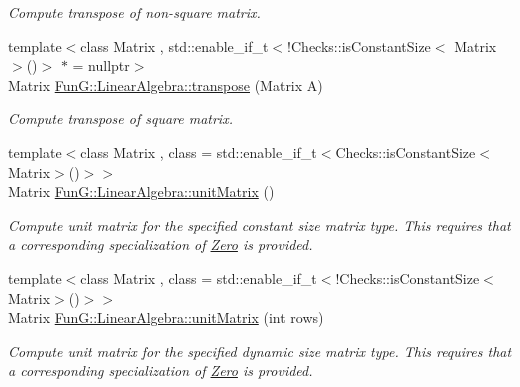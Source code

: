 \begin{DoxyCompactItemize}
\begin{DoxyCompactList}\small\item\em Compute transpose of non-\/square matrix. \end{DoxyCompactList}\item 
\hypertarget{group__LinearAlgebraGroup_gac3427d39b75727a255e5ea387c50ff10}{{\footnotesize template$<$class Matrix , std\-::enable\-\_\-if\-\_\-t$<$!\-Checks\-::is\-Constant\-Size$<$ Matrix $>$()$>$ $\ast$  = nullptr$>$ }\\Matrix \hyperlink{group__LinearAlgebraGroup_gac3427d39b75727a255e5ea387c50ff10}{Fun\-G\-::\-Linear\-Algebra\-::transpose} (Matrix A)}\label{group__LinearAlgebraGroup_gac3427d39b75727a255e5ea387c50ff10}

\begin{DoxyCompactList}\small\item\em Compute transpose of square matrix. \end{DoxyCompactList}\item 
\hypertarget{group__LinearAlgebraGroup_ga88a596b8526c0ed98ce241244fb85948}{{\footnotesize template$<$class Matrix , class  = std\-::enable\-\_\-if\-\_\-t$<$\-Checks\-::is\-Constant\-Size$<$\-Matrix$>$()$>$$>$ }\\Matrix \hyperlink{group__LinearAlgebraGroup_ga88a596b8526c0ed98ce241244fb85948}{Fun\-G\-::\-Linear\-Algebra\-::unit\-Matrix} ()}\label{group__LinearAlgebraGroup_ga88a596b8526c0ed98ce241244fb85948}

\begin{DoxyCompactList}\small\item\em Compute unit matrix for the specified constant size matrix type. This requires that a corresponding specialization of \hyperlink{structFunG_1_1Zero}{Zero} is provided. \end{DoxyCompactList}\item 
\hypertarget{group__LinearAlgebraGroup_gae50c49f62ed072019079a7563688e5de}{{\footnotesize template$<$class Matrix , class  = std\-::enable\-\_\-if\-\_\-t$<$!\-Checks\-::is\-Constant\-Size$<$\-Matrix$>$()$>$$>$ }\\Matrix \hyperlink{group__LinearAlgebraGroup_gae50c49f62ed072019079a7563688e5de}{Fun\-G\-::\-Linear\-Algebra\-::unit\-Matrix} (int rows)}\label{group__LinearAlgebraGroup_gae50c49f62ed072019079a7563688e5de}

\begin{DoxyCompactList}\small\item\em Compute unit matrix for the specified dynamic size matrix type. This requires that a corresponding specialization of \hyperlink{structFunG_1_1Zero}{Zero} is provided. \end{DoxyCompactList}\end{DoxyCompactItemize}


